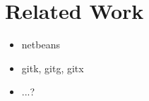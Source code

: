 \section{Related Work}
\label{sec:Related_Work}

\begin{itemize}
	\item netbeans
	\item gitk, gitg, gitx
	\item ...?
\end{itemize}